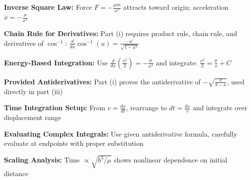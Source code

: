 \begin{takeaways}
\item \textbf{Inverse Square Law:} Force $F = -\frac{\mu m}{x^2}$ attracts toward origin; acceleration $\ddot{x} = -\frac{\mu}{x^2}$
\item \textbf{Chain Rule for Derivatives:} Part (i) requires product rule, chain rule, and derivatives of $\cos^{-1}$: $\frac{d}{dx}\cos^{-1}(u) = \frac{-u'}{\sqrt{1-u^2}}$
\item \textbf{Energy-Based Integration:} Use $\frac{d}{dx}(\frac{v^2}{2}) = -\frac{\mu}{x^2}$ and integrate: $\frac{v^2}{2} = \frac{\mu}{x} + C$
\item \textbf{Provided Antiderivatives:} Part (i) proves the antiderivative of $-\sqrt{\frac{x}{b-x}}$, used directly in part (iii)
\item \textbf{Time Integration Setup:} From $v = \frac{dx}{dt}$, rearrange to $dt = \frac{dx}{v}$ and integrate over displacement range
\item \textbf{Evaluating Complex Integrals:} Use given antiderivative formula, carefully evaluate at endpoints with proper substitution
\item \textbf{Scaling Analysis:} Time $\propto \sqrt{b^3/\mu}$ shows nonlinear dependence on initial distance
\end{takeaways}
